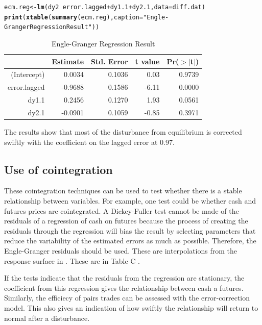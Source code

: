 \documentclass{article}\usepackage{graphicx, color}
\makeatletter
\newcommand{\hlfunctioncall}[1]{\textcolor[rgb]{0.501960784313725,0,0.329411764705882}{\textbf{#1}}}%
\newcommand{\hlstring}[1]{\textcolor[rgb]{0.6,0.6,1}{#1}}%
\newenvironment{kframe}{%
 \def\at@end@of@kframe{}%
 \ifinner\ifhmode%
  \def\at@end@of@kframe{\end{minipage}}%
  \begin{minipage}{\columnwidth}%
 \fi\fi%
 \def\FrameCommand##1{\hskip\@totalleftmargin \hskip-\fboxsep
 \colorbox{shadecolor}{##1}\hskip-\fboxsep
     \hskip-\linewidth \hskip-\@totalleftmargin \hskip\columnwidth}%
 \MakeFramed {\advance\hsize-\width
   \@totalleftmargin\z@ \linewidth\hsize
   \@setminipage}}%
 {\par\unskip\endMakeFramed%
 \at@end@of@kframe}
\makeatother
\begin{document}
\begin{kframe}
\begin{alltt}
ecm.reg <- \hlfunctioncall{lm}(dy2 ~ error.lagged + dy1.1 + dy2.1, data = diff.dat)
\hlfunctioncall{print}(\hlfunctioncall{xtable}(\hlfunctioncall{summary}(ecm.reg), caption = \hlstring{"Engle-Granger Regression Result"}))
\end{alltt}
\end{kframe}%
\begin{table}[ht]
\begin{center}
\begin{tabular}{rrrrr}
  \hline
 & Estimate & Std. Error & t value & Pr($>$$|$t$|$) \\ 
  \hline
(Intercept) & 0.0034 & 0.1036 & 0.03 & 0.9739 \\ 
  error.lagged & -0.9688 & 0.1586 & -6.11 & 0.0000 \\ 
  dy1.1 & 0.2456 & 0.1270 & 1.93 & 0.0561 \\ 
  dy2.1 & -0.0901 & 0.1059 & -0.85 & 0.3971 \\ 
   \hline
\end{tabular}
\caption{Engle-Granger Regression Result}
\end{center}
\end{table}


The results show that most of the disturbance from equilibrium is corrected swiftly with the coefficient on the lagged error at 0.97. 

\subsection{Use of cointegration}
These cointegration techniques can be used to test whether there is a stable relationship between variables.  For example, one test could be whether cash and futures prices are cointegrated.  A Dickey-Fuller test cannot be made of the residuals of a regression of cash on futures because the process of creating the residuals through the regression will bias the result by selecting parameters that reduce the variability of the estimated errors as much as possible.  Therefore, the Engle-Granger residuals should be used.  These are interpolations from the response surface in \citep{MacKinnon1996}.  These are in Table C \citep[p. 490]{EndersTS}.  

If the tests indicate that the residuals from the regression are stationary, the coefficient from this regression gives the relationship between cash a futures. Similarly, the efficiecy of pairs trades can be assessed with the error-correction model. This also gives an indication of how swiftly the relationship will return to normal after a disturbance. 
\end{document}
